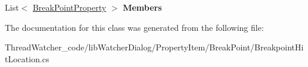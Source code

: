 \begin{DoxyCompactItemize}
\item 
\hypertarget{classlib_watcher_dialog_1_1_property_item_1_1_break_point_1_1_breakpoint_hit_location_a485c3d9507380aaacdbf8d0505263bd8}{List$<$ \hyperlink{classlib_watcher_dialog_1_1_property_item_1_1_break_point_1_1_break_point_property}{Break\+Point\+Property} $>$ {\bfseries Members}}\label{classlib_watcher_dialog_1_1_property_item_1_1_break_point_1_1_breakpoint_hit_location_a485c3d9507380aaacdbf8d0505263bd8}

\end{DoxyCompactItemize}


The documentation for this class was generated from the following file\+:\begin{DoxyCompactItemize}
\item 
Thread\+Watcher\+\_\+code/lib\+Watcher\+Dialog/\+Property\+Item/\+Break\+Point/Breakpoint\+Hit\+Location.\+cs\end{DoxyCompactItemize}
